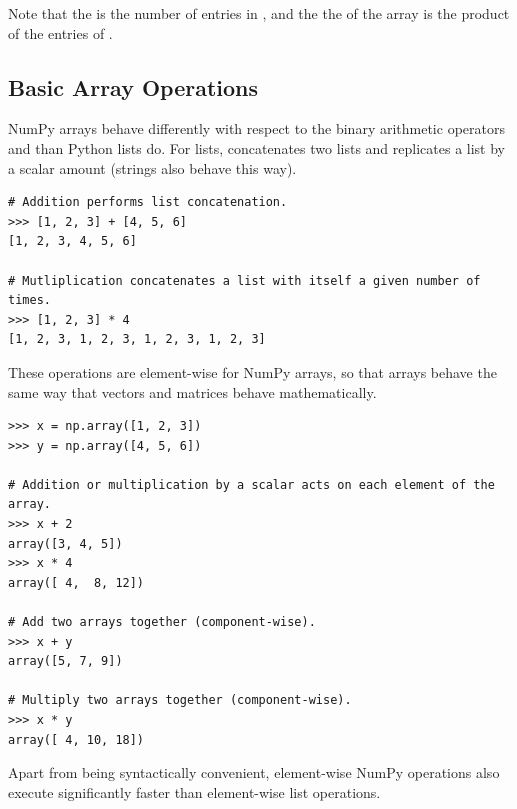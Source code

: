 Note that the  is the number of entries in , and the
the  of the array is the product of the entries of .

\subsection*{Basic Array Operations} %

NumPy arrays behave differently with respect to the binary arithmetic operators \li{+} and \li{*} than Python lists do.
For lists, \li{+} concatenates two lists and \li{*} replicates a list by a scalar amount (strings also behave this way).

\begin{lstlisting}
# Addition performs list concatenation.
>>> [1, 2, 3] + [4, 5, 6]
[1, 2, 3, 4, 5, 6]

# Mutliplication concatenates a list with itself a given number of times.
>>> [1, 2, 3] * 4
[1, 2, 3, 1, 2, 3, 1, 2, 3, 1, 2, 3]
\end{lstlisting}

These operations are element-wise for NumPy arrays, so that arrays behave the same way that vectors and matrices behave mathematically.

\begin{lstlisting}
>>> x = np.array([1, 2, 3])
>>> y = np.array([4, 5, 6])

# Addition or multiplication by a scalar acts on each element of the array.
>>> x + 2
array([3, 4, 5])
>>> x * 4
array([ 4,  8, 12])

# Add two arrays together (component-wise).
>>> x + y
array([5, 7, 9])

# Multiply two arrays together (component-wise).
>>> x * y
array([ 4, 10, 18])
\end{lstlisting}

Apart from being syntactically convenient, element-wise NumPy operations also execute significantly faster than element-wise list operations.

